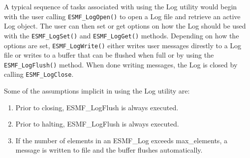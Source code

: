 

A typical sequence of tasks associated with using the Log utility would begin
with the user calling {\tt ESMF\_LogOpen()} to open a Log file and retrieve
an active Log object.  The user can then set or get options on how the Log
should be used with the {\tt ESMF\_LogSet()} and {\tt ESMF\_LogGet()} methods.
Depending on how the options are set, {\tt ESMF\_LogWrite()} either writes
user messages direstly to a Log file or writes to a buffer that can be flushed
when full or by using the {\tt ESMF\_LogFlush()} method.  When done writing
messages, the Log is closed by calling {\tt ESMF\_LogClose}.  

Some of the assumptions implicit in using the Log utility are:

\begin{enumerate}

\item Prior to closing, ESMF_LogFlush is always executed.
\item Prior to halting, ESMF_LogFlush is always executed.
\item If the number of elements in an ESMF_Log exceeds max_elements, a message 
   is written to file and the buffer flushes automatically.

\end{enumerate}
